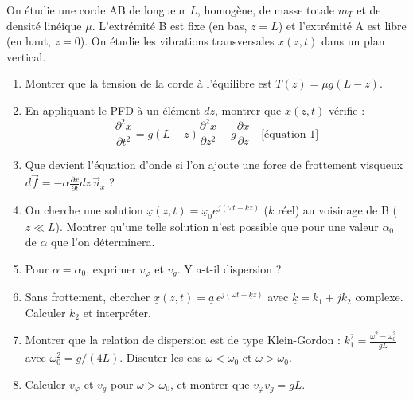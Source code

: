 \documentclass[12pt,a4paper]{article}
\begin{document}
\begin{boiteexercice}
On étudie une corde AB de longueur $L$, homogène, de masse totale $m_T$ et de densité linéique $\mu$. L'extrémité B est fixe (en bas, $z=L$) et l'extrémité A est libre (en haut, $z=0$). On étudie les vibrations transversales $x(z,t)$ dans un plan vertical.
\begin{enumerate}
  \item Montrer que la tension de la corde à l'équilibre est $T(z) = \mu g(L-z)$.
  \item En appliquant le PFD à un élément $dz$, montrer que $x(z,t)$ vérifie :
  \[
  \frac{\partial^2 x}{\partial t^2} = g(L-z)\frac{\partial^2 x}{\partial z^2} - g\frac{\partial x}{\partial z}
  \quad\text{[équation 1]}
  \]
  \item Que devient l'équation d'onde si l'on ajoute une force de frottement visqueux $d\vec{f} = -\alpha\frac{\partial x}{\partial t}dz\,\vec{u}_x$ ?
  \item On cherche une solution $\underline{x}(z,t)=\underline{x}_0 e^{j(\omega t - kz)}$ ($k$ réel) au voisinage de B ($z\ll L$). Montrer qu'une telle solution n'est possible que pour une valeur $\alpha_0$ de $\alpha$ que l'on déterminera.
  \item Pour $\alpha=\alpha_0$, exprimer $v_\varphi$ et $v_g$. Y a-t-il dispersion ?
  \item Sans frottement, chercher $\underline{x}(z,t)=\underline{a}\,e^{j(\omega t - \underline{k}z)}$ avec $\underline{k}=k_1+jk_2$ complexe. Calculer $k_2$ et interpréter.
  \item Montrer que la relation de dispersion est de type Klein-Gordon : $k_1^2 = \frac{\omega^2 - \omega_0^2}{gL}$ avec $\omega_0^2 = g/(4L)$. Discuter les cas $\omega < \omega_0$ et $\omega > \omega_0$.
  \item Calculer $v_\varphi$ et $v_g$ pour $\omega > \omega_0$, et montrer que $v_\varphi v_g = gL$.
\end{enumerate}
\end{boiteexercice}
\end{document}

